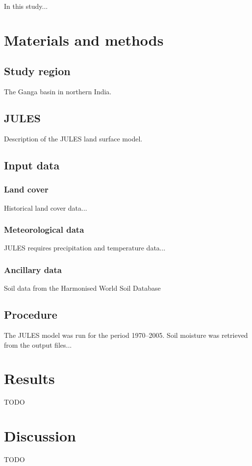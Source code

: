 \documentclass{icldt}\usepackage[]{graphicx}\usepackage[]{color}
\begin{document}
In this study... \\

\section{Materials and methods}

\subsection{Study region}
The Ganga basin in northern India.

\subsection{JULES}
Description of the JULES land surface model.

\subsection{Input data}

\subsubsection{Land cover}
Historical land cover data... \\

\subsubsection{Meteorological data}
JULES requires precipitation and temperature data...

\subsubsection{Ancillary data}
Soil data from the Harmonised World Soil Database

\subsection{Procedure}
The JULES model was run for the period 1970--2005. Soil moisture was retrieved from the output files... \\

\section{Results}
TODO

\section{Discussion}
TODO
\end{document}
